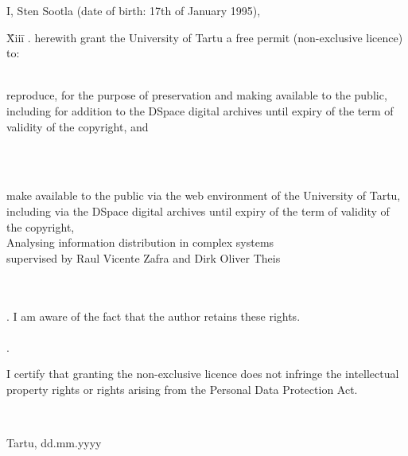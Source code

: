 \documentclass[12pt]{article}
\begin{document}
I, Sten Sootla (date of birth: 17th of January 1995),

\begin{tabbing}
\= Xiii\=\kill
{}. \> herewith grant the University of Tartu a free permit (non-exclusive licence) to:\\\\ 

\> 
\begin{minipage}[t]{14.2cm}
reproduce, for the purpose of preservation and making available to the public, including for addition to the DSpace digital archives until expiry of the term of validity of the copyright, and
\end{minipage}
\\\\
\begin{minipage}[t]{14.2cm}
make available to the public via the web environment of the University of Tartu, including via the DSpace digital archives until expiry of the term of validity of the copyright,\\ 

Analysing information distribution in complex systems\\   

supervised by Raul Vicente Zafra and Dirk Oliver Theis

\end{minipage}\\\\ 
. \>I am aware of the fact that the author retains these rights.\\\\
. \>
\begin{minipage}[t]{14.2cm}
I certify that granting the non-exclusive licence does not infringe the intellectual property rights or rights arising from the Personal Data Protection Act. 
\end{minipage}\\
\end{tabbing}

\noindent
Tartu, dd.mm.yyyy
\end{document}
